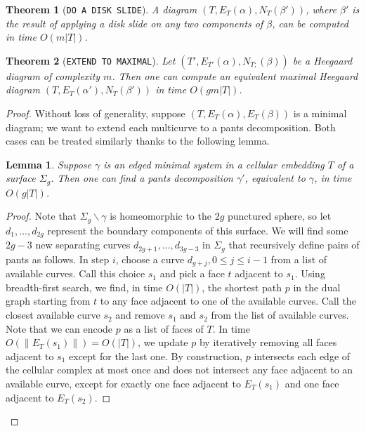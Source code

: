 \documentclass[10pt,a4paper]{amsart}
\newtheorem{theorem}{Theorem}
\newtheorem{lemma}{Lemma}
\begin{document}
\begin{theorem}[\texttt{DO A DISK SLIDE}]\label{th: do a disk slide}
    A diagram $(T,E_T(\alpha),N_T(\beta'))$, where $\beta'$ is the result of applying a disk slide on any two components of $\beta$, can be computed in time $O(m|T|)$.
\end{theorem}

\begin{theorem}[\texttt{EXTEND TO MAXIMAL}]\label{th: extend to maximal}
    Let $(T',E_{T'}(\alpha),N_{T;}(\beta))$ be a Heegaard diagram of complexity $m$. Then one can compute an equivalent maximal Heegaard diagram $(T,E_T(\alpha'),N_T(\beta'))$ in time $O(gm|T|)$.
\end{theorem}

\begin{proof}
    Without loss of generality, suppose $(T,E_T(\alpha),E_T(\beta))$ is a minimal diagram; we want to extend each multicurve to a pants decomposition. 
    Both cases can be treated similarly thanks to the following lemma.

\begin{lemma}\label{lm: get pants}
    Suppose $\gamma$ is an edged minimal system in a cellular embedding $T$ of a surface $\Sigma_g$. Then one can find a pants decomposition $\gamma'$, equivalent to $\gamma$, in time $O(g|T|)$.
\end{lemma}
\begin{proof}
    Note that $\Sigma_g\backslash \gamma$ is homeomorphic to the $2g$ punctured sphere, so let $d_1,\dots,d_{2g}$ represent the boundary components of this surface.
    We will find some $2g-3$ new separating curves $d_{2g+1},\dots, d_{3g-3}$ in $\Sigma_g$ that recursively define pairs of pants as follows.
    In step $i$, choose a curve $d_{g+j}, 0\leq j\leq i-1$ from a list of available curves. 
    Call this choice $s_1$ and pick a face $t$ adjacent to $s_1$. 
    Using breadth-first search, we find, in time $O(|T|)$, the shortest path $p$ in the dual graph starting from $t$ to any face adjacent to one of the available curves.
    Call the closest available curve $s_2$ and remove $s_1$ and $s_2$ from the list of available curves. 
    Note that we can encode $p$ as a list of faces of $T$.
    In time $O(\|E_T(s_1)\|)=O(|T|)$, we update $p$ by iteratively removing all faces adjacent to $s_1$ except for the last one.
    By construction, $p$ intersects each edge of the cellular complex at most once and does not intersect any face adjacent to an available curve, except for exactly one face adjacent to $E_T({s_1})$ and one face adjacent to $E_T({s_2})$.
    

\end{proof}
\end{proof}
\end{document}
